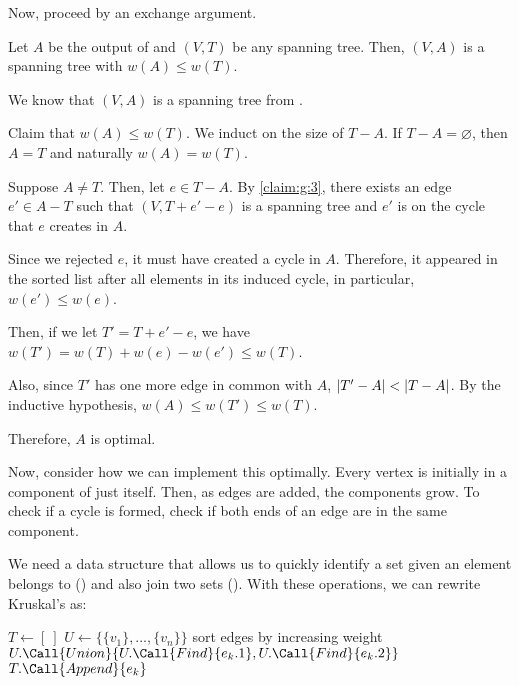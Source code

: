 Now, proceed by an exchange argument.

\begin{prop}
  Let $A$ be the output of  and $(V,T)$ be any spanning tree.
  Then, $(V,A)$ is a spanning tree with $w(A) \leq w(T)$.
\end{prop}
\begin{prf}
  We know that $(V,A)$ is a spanning tree from .

  Claim that $w(A) \leq w(T)$. We induct on the size of $T - A$.
  If $T - A = \varnothing$, then $A = T$ and naturally $w(A) = w(T)$.

  Suppose $A \neq T$. Then, let $e \in T - A$.
  By \cref{claim:g:3}, there exists an edge $e' \in A - T$
  such that $(V, T+e'-e)$ is a spanning tree and $e'$ is on the cycle that $e$ creates in $A$.

  Since we rejected $e$, it must have created a cycle in $A$.
  Therefore, it appeared in the sorted list after all elements in its induced cycle,
  in particular, $w(e') \leq w(e)$.

  Then, if we let $T' = T + e' - e$,
  we have $w(T') = w(T) + w(e) - w(e') \leq w(T)$.

  Also, since $T'$ has one more edge in common with $A$,
  $\abs{T' - A} < \abs{T - A}$.
  By the inductive hypothesis, $w(A) \leq w(T') \leq w(T)$.

  Therefore, $A$ is optimal.
\end{prf}

Now, consider how we can implement this optimally.
Every vertex is initially in a component of just itself.
Then, as edges are added, the components grow.
To check if a cycle is formed, check if both ends of an edge are in the same component.

We need a data structure that allows us to quickly identify
a set given an element belongs to () and also join two sets ().
With these operations, we can rewrite Kruskal's as:

\begin{algorithm}[H]
  \caption{}
  \begin{algorithmic}[1]
    \State $T \gets [\ ]$
    \State $U \gets \{\{v_1\},\dotsc,\{v_n\}\}$
    \State sort edges by increasing weight
        \State $U.\Call{Union}{U.\Call{Find}{e_k.1}, U.\Call{Find}{e_k.2}}$
        \State $T.\Call{Append}{e_k}$
      \EndIf
    \EndFor
  \end{algorithmic}
\end{algorithm}

